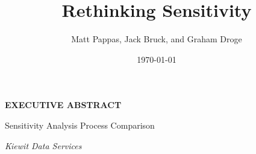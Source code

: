 \documentclass[12pt, a4paper]{article} %
\title{Rethinking Sensitivity}
\author{Matt Pappas, Jack Bruck, and Graham Droge}
\date{\today}
\begin{document}
\begin{center}

    \vspace{0.5em}

    {\LARGE \bfseries \MakeUppercase{Executive Abstract} \par}

    \vspace{0.25em}

    {\small Sensitivity Analysis Process Comparison}

    \vspace{0.25em}

    {\small \emph{Kiewit Data Services}}

    \vspace{0.5em}
    
\end{center}
\end{document}
